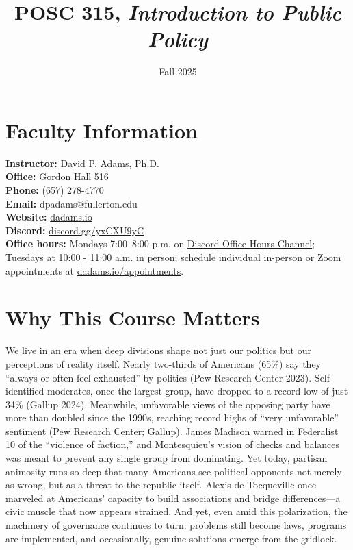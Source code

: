 \documentclass[12pt]{article}     %
\title{POSC 315, \textit{Introduction to Public Policy}} %
\author{}                         %
\date{Fall 2025}                  %
\begin{document}
\maketitle

\section{Faculty Information}
\noindent \textbf{Instructor:} David P. Adams, Ph.D. \\
\noindent \textbf{Office:} Gordon Hall 516 \\
\noindent \textbf{Phone:} (657) 278-4770 \\
\noindent \textbf{Email:} dpadams@fullerton.edu \\
\noindent \textbf{Website:} \href{https://dadams.io}{dadams.io} \\
\noindent \textbf{Discord:} \href{https://discord.gg/yxCXU9yC}{discord.gg/yxCXU9yC} \\
\noindent \textbf{Office hours:} Mondays 7:00--8:00 p.m. on \href{https://discord.gg/yxCXU9yC}{Discord Office Hours Channel}; Tuesdays at 10:00 - 11:00 a.m. in person; schedule individual in-person or Zoom appointments at \href{https://dadams.io/appointments}{dadams.io/appointments}. 

\section{Why This Course Matters}

We live in an era when deep divisions shape not just our politics but our perceptions of reality itself. Nearly two-thirds of Americans (65\%) say they ``always or often feel exhausted'' by politics (Pew Research Center 2023). Self-identified moderates, once the largest group, have dropped to a record low of just 34\% (Gallup 2024). Meanwhile, unfavorable views of the opposing party have more than doubled since the 1990s, reaching record highs of “very unfavorable” sentiment (Pew Research Center; Gallup). James Madison warned in Federalist 10 of the “violence of faction,” and Montesquieu's vision of checks and balances was meant to prevent any single group from dominating. Yet today, partisan animosity runs so deep that many Americans see political opponents not merely as wrong, but as a threat to the republic itself. Alexis de Tocqueville once marveled at Americans' capacity to build associations and bridge differences—a civic muscle that now appears strained. And yet, even amid this polarization, the machinery of governance continues to turn: problems still become laws, programs are implemented, and occasionally, genuine solutions emerge from the gridlock.
\end{document}
